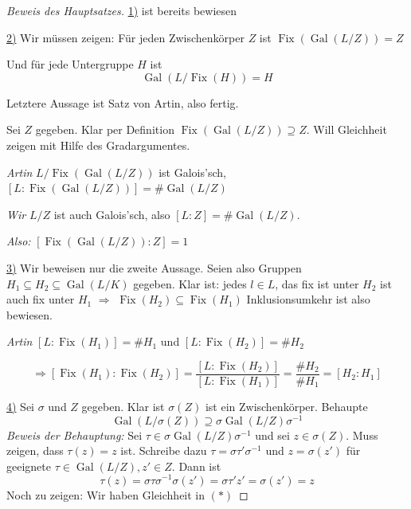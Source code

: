 \documentclass[a4paper,12pt,numbers=noenddot,parskip=full]{scrartcl}
\newcommand{\heading}{\underline}
\DeclareMathOperator{\Gal}{Gal}
\theoremstyle{dotless}
\theoremstyle{remark}
\begin{document}
	\begin{proof}[Beweis des Hauptsatzes]
		\heading{1)} ist bereits bewiesen
		
		\heading{2)} Wir müssen zeigen: Für jeden Zwischenkörper $Z$ ist $\operatorname{Fix}(\Gal(L/Z)) = Z$
		
		Und für jede Untergruppe $H$ ist
		\begin{equation*}
			\Gal(L/\operatorname{Fix}(H)) = H
		\end{equation*}
		
		Letztere Aussage ist Satz von Artin, also fertig.
		
		Sei $Z$ gegeben. Klar per Definition $\operatorname{Fix}(\Gal(L/Z)) \supseteq Z$. Will Gleichheit zeigen mit Hilfe des Gradargumentes.
		
		\textit{Artin} $L/\operatorname{Fix}(\Gal(L/Z))$ ist Galois'sch, $[L: \operatorname{Fix}(\Gal(L/Z))] = \#\Gal(L/Z)$
		
		\textit{Wir} $L/Z$ ist auch Galois'sch, also $[L:Z] = \#\Gal(L/Z)$.
		
		\textit{Also:} $[\operatorname{Fix}(\Gal(L/Z)): Z] = 1$
		
		\heading{3)} Wir beweisen nur die zweite Aussage. Seien also Gruppen $H_1 \subseteq H_2 \subseteq \Gal(L/K)$ gegeben. Klar ist: jedes $l \in L$, das fix ist unter $H_2$ ist auch fix unter $H_1$ $\Rightarrow$ $\operatorname{Fix}(H_2) \subseteq \operatorname{Fix}(H_1)$ Inklusionsumkehr ist also bewiesen.
		
		\textit{Artin} $[L: \operatorname{Fix}(H_1)] = \#H_1$ und $[L: \operatorname{Fix}(H_2)] = \#H_2$
		
		\begin{equation*}
			\Rightarrow [\operatorname{Fix}(H_1): \operatorname{Fix}(H_2)] = \frac{[L: \operatorname{Fix}(H_2)]}{[L: \operatorname{Fix}(H_1)]} = \frac{\#H_2}{\#H_1} = [H_2: H_1]
		\end{equation*}
		
		\heading{4)} Sei $\sigma$ und $Z$ gegeben. Klar ist $\sigma(Z)$ ist ein Zwischenkörper. Behaupte
		\begin{equation*}
			\Gal(L/\sigma(Z)) \supseteq \sigma \Gal(L/Z) \sigma^{-1} \tag{$*$}
		\end{equation*}
		\textit{Beweis der Behauptung:} Sei $\tau \in \sigma \Gal(L/Z) \sigma^{-1}$ und sei $z \in \sigma(Z)$. Muss zeigen, dass $\tau(z) = z$ ist. Schreibe dazu $\tau = \sigma \tau' \sigma^{-1}$ und $z = \sigma(z')$ für geeignete $\tau \in \Gal(L/Z), z' \in Z$. Dann ist
		\begin{equation*}
			\tau(z) = \sigma \tau \sigma^{-1} \sigma(z') = \sigma \tau' z' = \sigma(z') = z
		\end{equation*}
		Noch zu zeigen: Wir haben Gleichheit in $(*)$
		

\end{proof}
\end{document}
